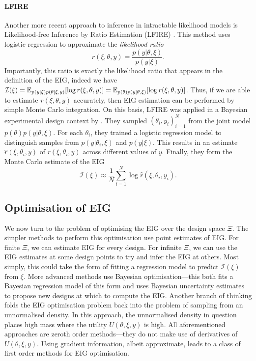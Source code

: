 \documentclass[a4paper, 10pt]{report}
\theoremstyle{plain}
\begin{document}
	\paragraph{LFIRE}
	Another more recent approach to inference in intractable likelihood models is Likelihood-free Inference by Ratio Estimation (LFIRE) \citep{dutta2016likelihood}.
	This method uses logistic regression to approximate the \emph{likelihood ratio}
	\begin{equation}
	r(\xi,\theta,y) = \frac{p(y|\theta,\xi)}{p(y|\xi)}.
	\end{equation}
	Importantly, this ratio is exactly the likelihood ratio that appears in the definition of the EIG, indeed we have $\mathcal{I}(\xi) = \mathbb{E}_{p(y|\xi)p(\theta|\xi,y)}[\log r(\xi,\theta,y)] = \mathbb{E}_{p(\theta)p(y|\theta,\xi)}[\log r(\xi,\theta,y)]$. Thus, if we are able to estimate $r(\xi,\theta,y)$ accurately, then EIG estimation can be performed by simple Monte Carlo integration.
	On this basis, LFIRE was applied in a Bayesian experimental design context by \citet{kleinegesse2018efficient}. 
	They sampled $(\theta_i,y_i)_{i=1}^N$ from the joint model $p(\theta)p(y|\theta,\xi)$.
	For each $\theta_i$, they trained a logistic regression model to distinguish samples from $p(y|\theta_i,\xi)$ and $p(y|\xi)$.
	This results in an estimate $\hat{r}(\xi,\theta_i,y)$ of $r(\xi,\theta_i,y)$ across different values of $y$.
	Finally, they form the Monte Carlo estimate of the EIG
	\begin{equation}
	\mathcal{I}(\xi) \approx \frac{1}{N} \sum_{i=1}^N \log \hat{r}(\xi,\theta_i,y_i).
	\end{equation}
	
	
	\subsection{Optimisation of EIG}
	\label{sec:opt_eig}
	We now turn to the problem of optimising the EIG over the design space $\Xi$. 
	The simpler methods to perform this optimisation use point estimates of EIG.
	For finite $\Xi$, we can estimate EIG for every design.
	For infinite $\Xi$, we can use the EIG estimates at some design points to try and infer the EIG at others.
	Most simply, this could take the form of fitting a regression model to predict $\mathcal{I}(\xi)$ from $\xi$.
	More advanced methods use Bayesian optimisation---this both fits a Bayesian regression model of this form and uses Bayesian uncertainty estimates to propose new designs at which to compute the EIG.
	Another branch of thinking folds the EIG optimisation problem back into the problem of sampling from an unnormalised density.
	In this approach, the unnormalised density in question places high mass where the utility $U(\theta,\xi,y)$ is high.
	All aforementioned approaches are zeroth order methods---they do not make use of derivatives of $U(\theta,\xi,y)$.
	Using gradient information, albeit approximate, leads to a class of first order methods for EIG optimisation.
	
\end{document}
